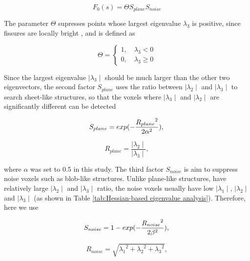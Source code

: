 {\begin{equation}
\label{eq:FissureHessian1}
F_0(s) = \Theta S_{plane} S_{noise}
\end{equation}

The parameter $\Theta$ supresses points whose largest eigenvalue $\lambda_{3}$ is positive, since fissures are locally bright , and is defined as

\begin{equation}
\label{eq:FissureHessian2}
\Theta = \begin{cases}
         1,\quad \lambda_{3}< 0\\
         0, \quad \lambda_{3}\geq0
         \end{cases}
\end{equation}

Since the largest eigenvalue $\mid\lambda_{3}\mid$ should be much larger than the other two eigenvectors, the second factor $S_{plane}$ uses the ratio between $\mid\lambda_{2}\mid$ and $\mid\lambda_{3}\mid$ to search sheet-like structures, so that the voxels where $\mid\lambda_{3}\mid$ and $\mid\lambda_{2}\mid$ are significantly different can be detected 

\begin{equation}
\label{eq:FissureHessian3}
S_{plane} = exp(-\frac{{R_{plane}}^2}{2\alpha^2}), \\
\end{equation}

\begin{equation}
\label{eq:FissureHessian4}
R_{plane} = \frac{\mid\lambda_{2}\mid}{\mid\lambda_{3}\mid},
\end{equation}

\noindent where $\alpha$ was set to 0.5 in this study. The third factor $S_{noise}$ is aim to suppress noise voxels such as blob-like structures. Unlike plane-like structures, have relatively large $\mid\lambda_{2}\mid$ and $\mid\lambda_{3}\mid$ ratio, the noise voxels usually have low $\mid\lambda_{1}\mid$, $\mid\lambda_{2}\mid$ and $\mid\lambda_{3}\mid$ (as shown in Table \ref{tab:Hessian-based eigenvalue analysis}). Therefore, here we use

\begin{equation}
\label{eq:FissureHessian5}
S_{noise} = 1 - exp(-\frac{{R_{noise}}^2}{2\beta^2}), \\
\end{equation}

\begin{equation}
\label{eq:FissureHessian6}
R_{noise} = \sqrt{{\lambda_1}^2+{\lambda_2}^2+{\lambda_3}^2},
\end{equation}

}
